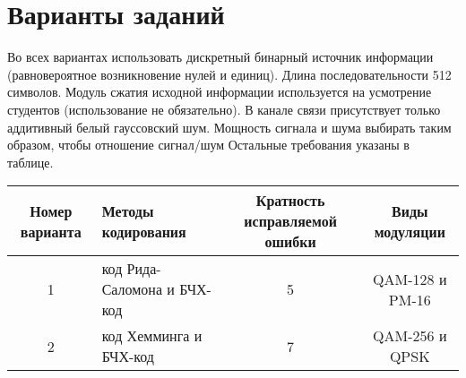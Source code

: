 \chapter{Варианты заданий}
Во всех вариантах использовать дискретный бинарный источник информации (равновероятное возникновение нулей и единиц). Длина последовательности 512 символов. Модуль сжатия исходной информации используется на усмотрение студентов (использование не обязательно). В канале связи присутствует только аддитивный белый гауссовский шум. Мощность сигнала и шума выбирать таким образом, чтобы отношение сигнал/шум  Остальные требования указаны в таблице.


\begin{center}
\begin{tabular}{|c|p{4cm}|c|c|}
\hline
Номер варианта & Методы кодирования & Кратность исправляемой ошибки & Виды модуляции \\
\hline
1 & код Рида-Саломона и БЧХ-код & 5 & QAM-128 и PM-16\\
\hline
2 & код Хемминга и БЧХ-код & 7 & QAM-256 и QPSK \\
\hline
\end{tabular}
\end{center}

 